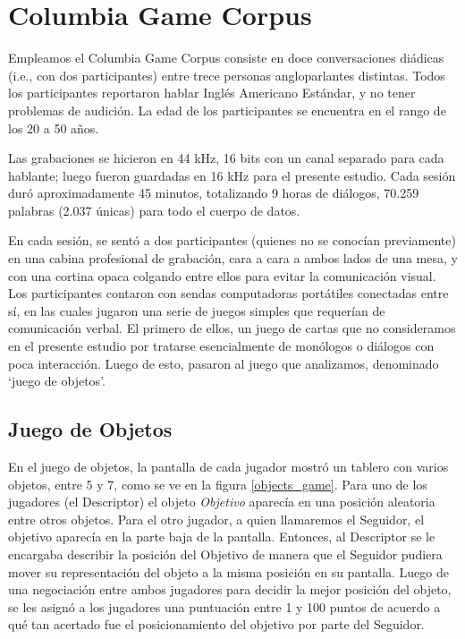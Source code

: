 \section{Columbia Game Corpus}

\newcommand{\objectgame} {\emph{Juego de objetos}}


Empleamos el Columbia Game Corpus  \cite{GRAV2009} consiste en doce conversaciones diádicas (i.e., con dos participantes) entre trece personas angloparlantes distintas. Todos los participantes reportaron hablar Inglés Americano Estándar, y no tener problemas de audición. La edad de los participantes se encuentra en el rango de los 20 a 50 años.

Las grabaciones se hicieron en 44 kHz, 16 bits con un canal separado para cada hablante; luego fueron guardadas en 16 kHz para el presente estudio. Cada sesión duró aproximadamente 45 minutos, totalizando 9 horas de
diálogos, 70.259 palabras (2.037 únicas) para todo el cuerpo de datos.

En cada sesión, se sentó a dos participantes (quienes no se conocían previamente) en una cabina profesional de grabación, cara a cara a ambos lados de una mesa, y con una cortina opaca colgando entre ellos para evitar la comunicación visual. Los participantes contaron con sendas computadoras portátiles conectadas entre sí, en las cuales jugaron una serie de juegos simples que requerían de comunicación verbal. El primero de ellos, un juego de cartas que no consideramos en el presente estudio por tratarse esencialmente de monólogos o diálogos con poca interacción. Luego de esto, pasaron al juego que analizamos, denominado `juego de objetos'.

\subsection{Juego de Objetos}

En el juego de objetos, la pantalla de cada jugador mostró un tablero con varios objetos, entre 5 y 7, como se ve en la figura \ref{objects_game}.
Para uno de los jugadores (el Descriptor) el objeto \emph{Objetivo} aparecía en una posición aleatoria entre otros objetos. Para el otro jugador, a quien llamaremos el Seguidor, el objetivo aparecía en la parte baja de la pantalla. Entonces, al Descriptor se le encargaba describir la posición del Objetivo de manera que el Seguidor pudiera mover su representación del objeto a la misma posición en su pantalla. Luego de una negociación entre ambos jugadores para decidir la mejor posición del objeto, se les asignó a los jugadores una puntuación entre 1 y 100 puntos de acuerdo a qué tan acertado fue el posicionamiento del objetivo por parte del Seguidor.

